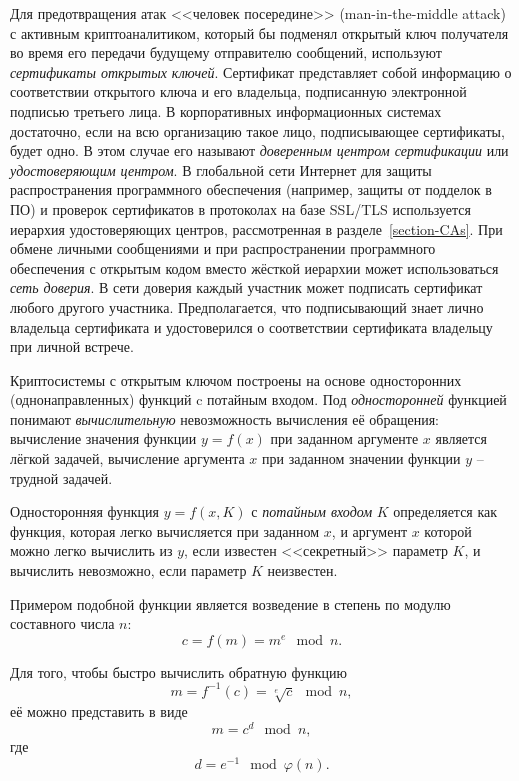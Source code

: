 Для предотвращения атак <<человек посередине>> (man-in-the-middle attack) с активным криптоаналитиком, который бы подменял открытый ключ получателя во время его передачи будущему отправителю сообщений, используют \emph{сертификаты открытых ключей}. Сертификат представляет собой информацию о соответствии открытого ключа и его владельца, подписанную электронной подписью третьего лица. В корпоративных информационных системах достаточно, если на всю организацию такое лицо, подписывающее сертификаты, будет одно. В этом случае его называют \emph{доверенным центром сертификации} или \emph{удостоверяющим центром}. В глобальной сети Интернет для защиты распространения программного обеспечения (например, защиты от подделок в ПО) и проверок сертификатов в протоколах на базе SSL/TLS используется иерархия удостоверяющих центров, рассмотренная в разделе~\ref{section-CAs}. При обмене личными сообщениями и при распространении программного обеспечения с открытым кодом вместо жёсткой иерархии может использоваться \emph{сеть доверия}. В сети доверия каждый участник может подписать сертификат любого другого участника. Предполагается, что подписывающий знает лично владельца сертификата и удостоверился о соответствии сертификата владельцу при личной встрече.

Криптосистемы с открытым ключом построены на основе односторонних (однонаправленных) функций c потайным входом. Под \emph{односторонней} функцией понимают \emph{вычислительную} невозможность вычисления её обращения: вычисление значения функции $y = f(x)$ при заданном аргументе $x$ является лёгкой задачей, вычисление аргумента $x$ при заданном значении функции $y$ -- трудной задачей.

Односторонняя функция $y = f(x,K)$ с \emph{потайным входом} $K$ определяется как функция, которая легко вычисляется при заданном $x$, и аргумент $x$ которой можно легко вычислить из $y$, если известен <<секретный>> параметр $K$, и вычислить невозможно, если параметр $K$ неизвестен.

Примером подобной функции является возведение в степень по модулю составного числа $n$:
	\[ c = f \left( m \right) = m ^ e \mod n.\]

Для того, чтобы быстро вычислить обратную функцию
	\[ m = f^{-1} \left( c \right) = \sqrt[e]{c} \mod n, \]
её можно представить в виде
	\[ m = c^{d} \mod n,\]
где
	\[ d = e^{-1} \mod \varphi \left( n \right). \]

